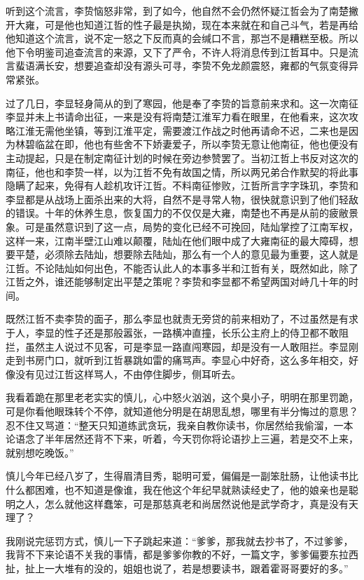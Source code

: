 听到这个流言，李贽恼怒非常，到了如今，他自然不会仍然怀疑江哲会为了南楚撇开大雍，可是他也知道江哲的性子最是执拗，现在本来就在和自己斗气，若是再给他知道这个流言，说不定一怒之下反而真的会缄口不言，那岂不是糟糕至极。所以他下令明鉴司追查流言的来源，又下了严令，不许人将消息传到江哲耳中。只是流言蜚语满长安，想要追查却没有源头可寻，李贽不免龙颜震怒，雍都的气氛变得异常紧张。

过了几日，李显轻身简从的到了寒园，他是奉了李贽的旨意前来求和。这一次南征李显并未上书请命出征，一来是没有将南楚江淮军力看在眼里，在他看来，这次攻略江淮无需他坐镇，等到江淮平定，需要渡江作战之时他再请命不迟，二来也是因为林碧临盆在即，他也有些舍不下娇妻爱子，所以李贽无意让他南征，他也便没有主动提起，只是在制定南征计划的时候在旁边参赞罢了。当初江哲上书反对这次的南征，他也和李贽一样，以为江哲不免有故国之情，所以两兄弟合作默契的将此事隐瞒了起来，免得有人趁机攻讦江哲。不料南征惨败，江哲所言字字珠玑，李贽和李显都是从战场上面杀出来的大将，自然不是寻常人物，很快就意识到了他们轻敌的错误。十年的休养生息，恢复国力的不仅仅是大雍，南楚也不再是从前的疲敝景象。可是虽然意识到了这一点，局势的变化已经不可挽回，陆灿掌控了江南军权，这样一来，江南半壁江山难以颠覆，陆灿在他们眼中成了大雍南征的最大障碍，想要平楚，必须除去陆灿，想要除去陆灿，那么有一个人的意见最为重要，这人就是江哲。不论陆灿如何出色，不能否认此人的本事多半和江哲有关，既然如此，除了江哲之外，谁还能够制定出平楚之策呢？李贽和李显都不希望两国对峙几十年的时间。

既然江哲不卖李贽的面子，那么李显也就责无旁贷的前来相劝了，不过虽然是有求于人，李显的性子还是那般嚣张，一路横冲直撞，长乐公主府上的侍卫都不敢阻拦，虽然主人说过不见客，可是李显一路直闯寒园，却是没有一人敢阻拦。李显刚走到书房门口，就听到江哲暴跳如雷的痛骂声。李显心中好奇，这么多年相交，好像没有见过江哲这样骂人，不由停住脚步，侧耳听去。

我看着跪在那里老老实实的慎儿，心中怒火汹汹，这个臭小子，明明在那里罚跪，可是你看他眼珠转个不停，就知道他分明是在胡思乱想，哪里有半分悔过的意思？忍不住又骂道：“整天只知道练武贪玩，我亲自教你读书，你居然给我偷溜，一本论语念了半年居然还背不下来，听着，今天罚你将论语抄上三遍，若是交不上来，就别想吃晚饭。”

慎儿今年已经八岁了，生得眉清目秀，聪明可爱，偏偏是一副笨肚肠，让他读书比什么都困难，也不知道是像谁，我在他这个年纪早就熟读经史了，他的娘亲也是聪明之人，怎么就他这样蠢笨，可是那慈真老和尚居然说他是武学奇才，真是没有天理了？

我刚说完惩罚方式，慎儿一下子跳起来道：“爹爹，那我就去抄书了，不过爹爹，我背不下来论语不关我的事情，都是爹爹你教的不好，一篇文字，爹爹偏要东拉西扯，扯上一大堆有的没的，姐姐也说了，若是想要读书，跟着霍哥哥要好的多。”

